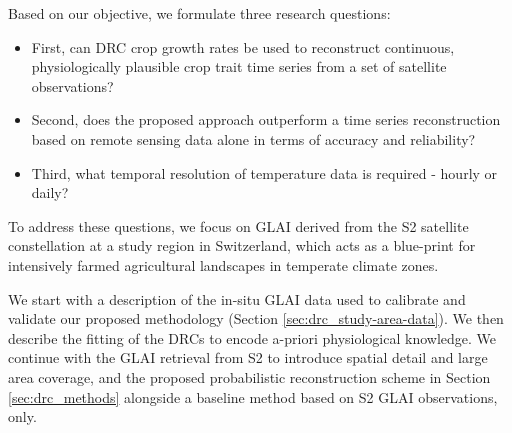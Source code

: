 Based on our objective, we formulate three research questions:

\begin{itemize}
    \item First, can \gls{DRC} crop growth rates be used to reconstruct continuous, physiologically plausible crop trait time series from a set of satellite observations?
    \item Second, does the proposed approach outperform a time series reconstruction based on remote sensing data alone in terms of accuracy and reliability?
    \item Third, what temporal resolution of temperature data is required - hourly or daily?

\end{itemize}

To address these questions, we focus on \gls{GLAI} derived from the \gls{S2} satellite constellation at a study region in Switzerland, which acts as a blue-print for intensively farmed agricultural landscapes in temperate climate zones.

We start with a description of the in-situ \gls{GLAI} data used to calibrate and validate our proposed methodology (Section \ref{sec:drc_study-area-data}). We then describe the fitting of the \gls{DRC}s to encode a-priori physiological knowledge. We continue with the \gls{GLAI} retrieval from \gls{S2} to introduce spatial detail and large area coverage, and the proposed probabilistic reconstruction scheme in Section \ref{sec:drc_methods} alongside a baseline method based on \gls{S2} \gls{GLAI} observations, only.